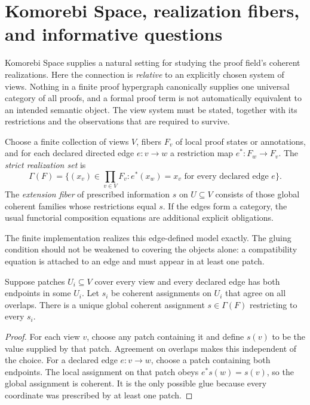 \section{Komorebi Space, realization fibers, and informative questions}
\label{PPT:sec:old23}
\label{PPT:sec:komorebi-bridge}

Komorebi Space supplies a natural setting for studying the proof field's coherent realizations. Here the connection is \emph{relative} to an explicitly chosen system of views. Nothing in a finite proof hypergraph canonically supplies one universal category of all proofs, and a formal proof term is not automatically equivalent to an intended semantic object. The view system must be stated, together with its restrictions and the observations that are required to survive.

\begin{PPTdefinition}
\label{PPT:res:23:1}
Choose a finite collection of views $V$, fibers $F_v$ of local proof states or annotations, and for each declared directed edge $e:v\to w$ a restriction map $e^*:F_w\to F_v$. The \emph{strict realization set} is
\[
\Gamma(F)=\big\{(x_v)\in\prod_{v\in V}F_v : e^*(x_w)=x_v\text{ for every declared edge }e\big\}.
\]
The \emph{extension fiber} of prescribed information $s$ on $U\subseteq V$ consists of those global coherent families whose restrictions equal $s$. If the edges form a category, the usual functorial composition equations are additional explicit obligations.
\end{PPTdefinition}

The finite implementation  realizes this edge-defined model exactly. The gluing condition should not be weakened to covering the objects alone: a compatibility equation is attached to an edge and must appear in at least one patch.

\begin{PPTtheorem}
\label{PPT:res:23:2}
Suppose patches $U_i\subseteq V$ cover every view and every declared edge has both endpoints in some $U_i$. Let $s_i$ be coherent assignments on $U_i$ that agree on all overlaps. There is a unique global coherent assignment $s\in\Gamma(F)$ restricting to every $s_i$.
\end{PPTtheorem}
\begin{proof}
For each view $v$, choose any patch containing it and define $s(v)$ to be the value supplied by that patch. Agreement on overlaps makes this independent of the choice. For a declared edge $e:v\to w$, choose a patch containing both endpoints. The local assignment on that patch obeys $e^*s(w)=s(v)$, so the global assignment is coherent. It is the only possible glue because every coordinate was prescribed by at least one patch.
\end{proof}

